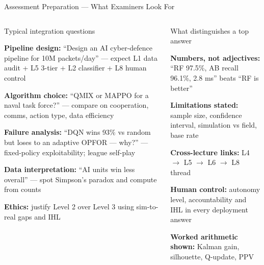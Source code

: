 \documentclass[aspectratio=169,10pt,t]{beamer}
\begin{document}
\begin{frame}{Assessment Preparation --- What Examiners Look For}
\begin{columns}[T]
\begin{cbox}{Typical integration questions}\scriptsize\begin{tl}\item \textbf{Pipeline design:} ``Design an AI cyber-defence pipeline for 10M packets/day'' --- expect L1 data audit + L5 3-tier + L2 classifier + L8 human control\item \textbf{Algorithm choice:} ``QMIX or MAPPO for a naval task force?'' --- compare on cooperation, comms, action type, data efficiency\item \textbf{Failure analysis:} ``DQN wins 93\% vs random but loses to an adaptive OPFOR --- why?'' --- fixed-policy exploitability; league self-play\item \textbf{Data interpretation:} ``AI units win less overall'' --- spot Simpson's paradox and compute from counts\item \textbf{Ethics:} justify Level 2 over Level 3 using sim-to-real gaps and IHL\end{tl}\end{cbox}
\begin{cbox}[ISSAgrn]{What distinguishes a top answer}\scriptsize\begin{tl}\item \textbf{Numbers, not adjectives:} ``RF 97.5\%, AB recall 96.1\%, 2.8 ms'' beats ``RF is better''\item \textbf{Limitations stated:} sample size, confidence interval, simulation vs field, base rate\item \textbf{Cross-lecture links:} L4 $\to$ L5 $\to$ L6 $\to$ L8 thread\item \textbf{Human control:} autonomy level, accountability and IHL in every deployment answer\item \textbf{Worked arithmetic shown:} Kalman gain, silhouette, Q-update, PPV\end{tl}\end{cbox}
\end{columns}
\end{frame}
\end{document}
